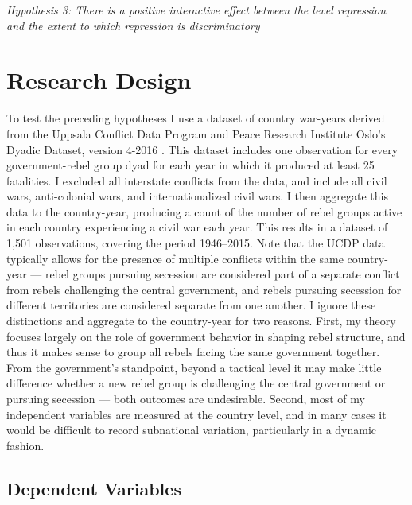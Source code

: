 \documentclass[12pt,]{book}
\begin{document}
\emph{Hypothesis 3: There is a positive interactive effect between the
level repression and the extent to which repression is discriminatory}

\section{Research Design}\label{research-design}

To test the preceding hypotheses I use a dataset of country war-years
derived from the Uppsala Conflict Data Program and Peace Research
Institute Oslo's Dyadic Dataset, version 4-2016
\citep{Harbom2008, Melander2016}. This dataset includes one observation
for every government-rebel group dyad for each year in which it produced
at least 25 fatalities. I excluded all interstate conflicts from the
data, and include all civil wars, anti-colonial wars, and
internationalized civil wars. I then aggregate this data to the
country-year, producing a count of the number of rebel groups active in
each country experiencing a civil war each year. This results in a
dataset of 1,501 observations, covering the period 1946--2015. Note that
the UCDP data typically allows for the presence of multiple conflicts
within the same country-year --- rebel groups pursuing secession are
considered part of a separate conflict from rebels challenging the
central government, and rebels pursuing secession for different
territories are considered separate from one another. I ignore these
distinctions and aggregate to the country-year for two reasons. First,
my theory focuses largely on the role of government behavior in shaping
rebel structure, and thus it makes sense to group all rebels facing the
same government together. From the government's standpoint, beyond a
tactical level it may make little difference whether a new rebel group
is challenging the central government or pursuing secession --- both
outcomes are undesirable. Second, most of my independent variables are
measured at the country level, and in many cases it would be difficult
to record subnational variation, particularly in a dynamic fashion.

\subsection{Dependent Variables}\label{dependent-variables}
\end{document}
